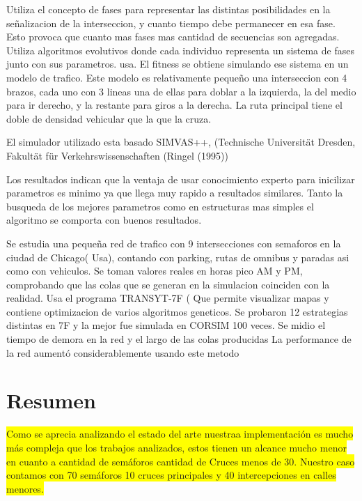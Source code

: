 \begin{itemize}
\begin{item}
Utiliza el concepto de fases para representar las distintas posibilidades en la señalizacion de la interseccion, y cuanto tiempo debe permanecer en esa fase. Esto provoca que cuanto mas fases mas cantidad de secuencias son agregadas.
Utiliza algoritmos evolutivos donde cada individuo representa un sistema de fases junto con sus parametros. usa. El fitness se obtiene simulando ese sistema en un modelo de trafico. Este modelo es relativamente pequeño una interseccion con 4 brazos, cada uno con 3 lineas una de ellas para doblar a la izquierda, la del medio para ir derecho, y la restante para giros a la derecha. La ruta principal tiene el doble de densidad vehicular que la que la cruza.

El simulador utilizado esta basado SIMVAS++, (Technische Universität Dresden, Fakultät für Verkehrswissenschaften (Ringel (1995))

Los resultados indican que la ventaja de usar conocimiento experto para inicilizar parametros es minimo ya que llega muy rapido a resultados similares. Tanto la busqueda de los mejores parametros como en estructuras mas simples el algoritmo se comporta con buenos resultados.
		
	\end{item}	
	
	\begin{item}

Se estudia una pequeña red de trafico con 9 intersecciones con semaforos en la ciudad de Chicago( Usa), contando con parking, rutas de omnibus y paradas asi como con vehiculos.  
Se toman valores reales en horas pico AM y PM, comprobando que las colas que se generan en la simulacion coinciden con la realidad.
Usa el programa TRANSYT-7F ( Que permite visualizar mapas y contiene optimizacion de varios algoritmos geneticos.
Se probaron 12 estrategias distintas en 7F y la mejor fue simulada en CORSIM 100 veces. Se midio el tiempo de demora en la red y el largo de las colas producidas
La performance de la red aumentó considerablemente usando este metodo	
	\end{item}	

\end{itemize}


\section{Resumen}
\colorbox{yellow}{
Como se aprecia analizando el estado del arte nuestraa implementación es mucho más compleja  que los trabajos analizados, estos tienen un alcance mucho menor en cuanto a cantidad de semáforos cantidad de Cruces menos de 30. Nuestro caso contamos con 70 semáforos 10 cruces principales y 40 intercepciones en calles menores.}